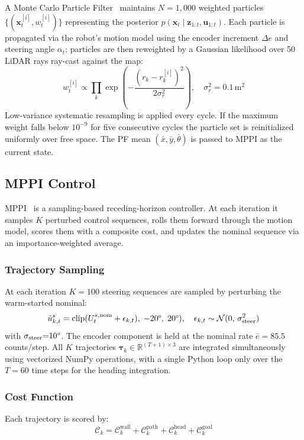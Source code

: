 \documentclass[conference]{IEEEtran}
\begin{document}
A Monte Carlo Particle Filter~\cite{thrun} maintains $N{=}1{,}000$ weighted particles $\{(\mathbf{x}_t^{[i]}, w_t^{[i]})\}$ representing the posterior $p(\mathbf{x}_t \mid \mathbf{z}_{1:t}, \mathbf{u}_{1:t})$. Each particle is propagated via the robot's motion model using the encoder increment $\Delta e$ and steering angle $\alpha_t$; particles are then reweighted by a Gaussian likelihood over 50 LiDAR rays ray-cast against the map:
\begin{equation}
    w_t^{[i]} \propto \prod_{k} \exp\!\left(-\frac{(r_k - r_k^{[i]})^2}{2\sigma_r^2}\right), \quad \sigma_r^2 = 0.1\,\mathrm{m}^2
\label{eq:weight}
\end{equation}
Low-variance systematic resampling is applied every cycle. If the maximum weight falls below $10^{-9}$ for five consecutive cycles the particle set is reinitialized uniformly over free space. The PF mean $(\bar{x},\bar{y},\bar{\theta})$ is passed to MPPI as the current state.

\subsection{MPPI Control}
\label{subsec:mppi}

MPPI~\cite{williams} is a sampling-based receding-horizon controller. At each iteration it samples $K$ perturbed control sequences, rolls them forward through the motion model, scores them with a composite cost, and updates the nominal sequence via an importance-weighted average.

\subsubsection{Trajectory Sampling}
At each iteration $K{=}100$ steering sequences are sampled by perturbing the warm-started nominal:
\begin{equation}
    \tilde{u}_{k,t}^s = \mathrm{clip}(U_{t}^{s,\mathrm{nom}} + \epsilon_{k,t}),\; -20\degree,\; 20\degree), \quad \epsilon_{k,t} \sim \mathcal{N}(0,\,\sigma_\mathrm{steer}^2)
    \label{eq:u_sample}
\end{equation}
with $\sigma_\mathrm{steer}{=}10\degree$. The encoder component is held at the nominal rate $\bar{e}{=}85.5$ counts/step. All $K$ trajectories $\boldsymbol{\tau}_k \in \mathbb{R}^{(T+1)\times3}$ are integrated simultaneously using vectorized NumPy operations, with a single Python loop only over the $T{=}60$ time steps for the heading integration.

\subsubsection{Cost Function}
Each trajectory is scored by:
\begin{equation}
    \mathcal{C}_k = \mathcal{C}_k^\mathrm{wall} + \mathcal{C}_k^\mathrm{path} + \mathcal{C}_k^\mathrm{head} + \mathcal{C}_k^\mathrm{goal}
\label{eq:total_cost}
\end{equation}
\end{document}

